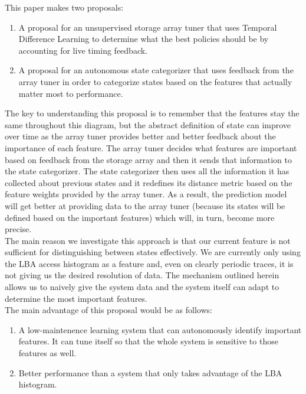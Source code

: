 \documentclass[11pt]{article}
\numberwithin{figure}{section}
\begin{document}
		This paper makes two proposals:
		\begin{enumerate}
			\item A proposal for an unsupervised storage array tuner that uses Temporal Difference Learning to determine what the best policies should be by accounting for live timing feedback.
			\item A proposal for an autonomous state categorizer that uses feedback from the array tuner in order to categorize states based on the features that actually matter most to performance.
		\end{enumerate}
		The key to understanding this proposal is to remember that the features stay the same throughout this diagram, but the abstract definition of state can improve over time as the array tuner provides better and better feedback about the importance of each feature. The array tuner decides what features are important based on feedback from the storage array and then it sends that information to the state categorizer. The state categorizer then uses all the information it has collected about previous states and it redefines its distance metric based on the feature weights provided by the array tuner. As a result, the prediction model will get better at providing data to the array tuner (because its states will be defined based on the important features) which will, in turn, become more precise. \\
		
		The main reason we investigate this approach is that our current feature is not sufficient for distinguishing between states effectively. We are currently only using the LBA access histogram as a feature and, even on clearly periodic traces, it is not giving us the desired resolution of data. The mechanism outlined herein allows us to naively give the system data and the system itself can adapt to determine the most important features.\\
		
		The main advantage of this proposal would be as follows:
		\begin{enumerate}
			\item A low-maintenence learning system that can autonomously identify important features. It can tune itself so that the whole system is sensitive to those features as well. 
			\item Better performance than a system that only takes advantage of the LBA histogram.
		\end{enumerate}
		
\end{document}
